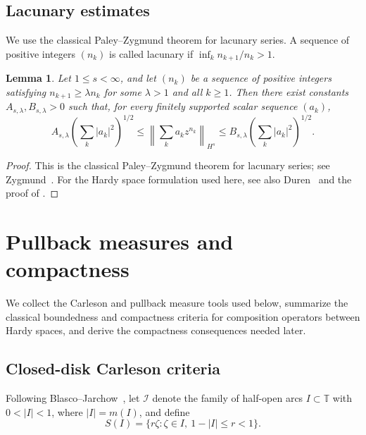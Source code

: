\documentclass[11pt, reqno]{amsart}
\newtheorem{lemma}[theorem]{Lemma}
\theoremstyle{definition}
\theoremstyle{remark}
\newcommand{\T}{\mathbb{T}}
\begin{document}
\subsection{Lacunary estimates}

We use the classical Paley--Zygmund theorem for lacunary series.  A sequence of
positive integers \((n_k)\) is called lacunary if
\(\inf_k n_{k+1}/n_k>1\).

\begin{lemma}
\label{lem:paley}
Let \(1\le s<\infty\), and let \((n_k)\) be a sequence of positive
integers satisfying \(n_{k+1}\ge\lambda n_k\) for some \(\lambda>1\)
and all \(k\ge1\).  Then there exist constants
\(A_{s,\lambda},B_{s,\lambda}>0\) such that, for every finitely
supported scalar sequence \((a_k)\),
\[
        A_{s,\lambda}
        \left(\sum_k|a_k|^2\right)^{1/2}
        \le
        \left\|\sum_k a_kz^{n_k}\right\|_{H^s}
        \le
        B_{s,\lambda}
        \left(\sum_k|a_k|^2\right)^{1/2}.
\]
\end{lemma}

\begin{proof}
This is the classical Paley--Zygmund theorem for lacunary series; see
Zygmund~\cite[Vol.~I, Ch.~V, Theorem~8.20]{Zygmund2002}.
For the Hardy space formulation used here, see also
Duren~\cite[p.~104]{Duren1970} and the proof of
\cite[Proposition~3.2]{LNST2017}.
\end{proof}






\section{Pullback measures and compactness}
\label{sec:pullback}

We collect the Carleson and pullback measure tools used below,
summarize the classical boundedness and compactness criteria for
composition operators between Hardy spaces, and derive the compactness
consequences needed later.

\subsection{Closed-disk Carleson criteria}
\label{subsec:carleson}

Following Blasco--Jarchow~\cite{BlascoJarchow2005}, let
\(\mathcal I\) denote the family of half-open arcs \(I\subset\T\) with
\(0<|I|<1\), where \(|I|=m(I)\), and define
\[
        S(I)
        =
        \{r\zeta:\zeta\in I,\ 1-|I|\le r<1\}.
\]
\end{document}
